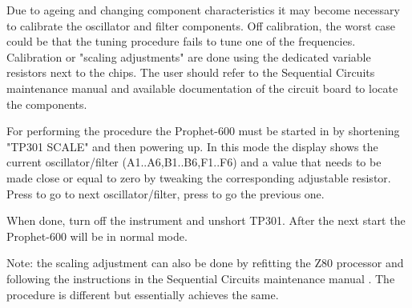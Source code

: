 Due to ageing and changing component characteristics it may become necessary to calibrate the oscillator and filter components. Off calibration, the worst case could be that the tuning procedure fails to tune one of the frequencies. Calibration or "scaling adjustments" are done using the dedicated variable resistors next to the chips. The user should refer to the Sequential Circuits maintenance manual \cite{p600siservicemanual} and available documentation of the circuit board to locate the components. 

For performing the procedure the Prophet-600 must be started in \maintenance by shortening "TP301 SCALE" and then powering up. In this mode the display shows the current oscillator/filter (A1..A6,B1..B6,F1..F6) and a value that needs to be made close or equal to zero by tweaking the corresponding adjustable resistor. Press  to go to next oscillator/filter, press  to go the previous one.

When done, turn off the instrument and unshort TP301. After the next start the Prophet-600 will be in normal mode.

Note: the scaling adjustment can also be done by refitting the Z80 processor and following the instructions in the Sequential Circuits maintenance manual \cite{p600siservicemanual}. The procedure is different but essentially achieves the same.
